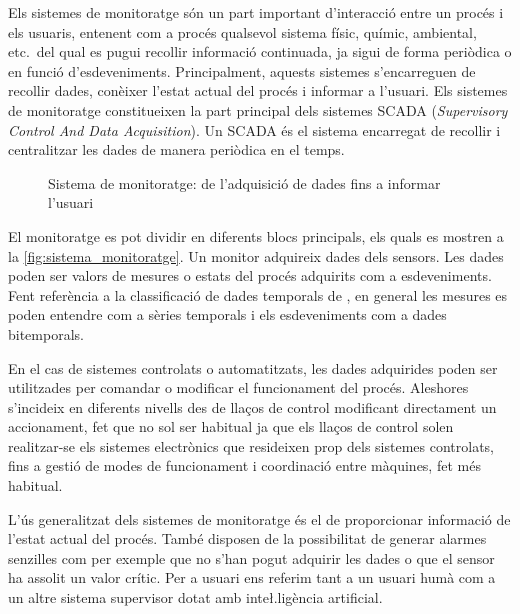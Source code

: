 Els sistemes de monitoratge són un part important d'interacció entre
un procés i els usuaris, entenent com a procés qualsevol sistema
físic, químic, ambiental, etc.\ del qual es pugui recollir informació
continuada, ja sigui de forma periòdica o en funció
d'esdeveniments. Principalment, aquests sistemes s'encarreguen de
recollir dades, conèixer l'estat actual del procés i informar a
l'usuari. Els sistemes de monitoratge constitueixen la part principal
dels sistemes SCADA (\emph{Supervisory Control And Data
  Acquisition}). Un SCADA és el sistema encarregat de recollir i
centralitzar les dades de manera periòdica en el temps.



\begin{figure}[tp]
  \begin{center}
    \scriptsize 
    
  \end{center}
  \caption{Sistema de monitoratge: de l'adquisició de dades fins a informar l'usuari}
  \label{fig:sistema_monitoratge}
\end{figure}


El monitoratge es pot dividir en diferents blocs principals, els quals
es mostren a la \autoref{fig:sistema_monitoratge}. Un monitor
adquireix dades dels sensors. Les dades poden ser valors de mesures o
estats del procés adquirits com a esdeveniments. Fent referència a la
classificació de dades temporals de \textcite{assfalg08:thesis}, en
general les mesures es poden entendre com a sèries temporals i els
esdeveniments com a dades bitemporals.

En el cas de sistemes controlats o automatitzats, les dades adquirides
poden ser utilitzades per comandar o modificar el funcionament del
procés. Aleshores s'incideix en diferents nivells des de llaços de
control modificant directament un accionament, fet que no sol ser
habitual ja que els llaços de control solen realitzar-se els sistemes
electrònics que resideixen prop dels sistemes controlats, fins a
gestió de modes de funcionament i coordinació entre màquines, fet més
habitual.

L'ús generalitzat dels sistemes de monitoratge és el de proporcionar
informació de l'estat actual del procés. També disposen de la
possibilitat de generar alarmes senzilles com per exemple que no s'han
pogut adquirir les dades o que el sensor ha assolit un valor
crític. Per a usuari ens referim tant a un usuari humà com a un altre
sistema supervisor dotat amb inte\l.ligència artificial.

